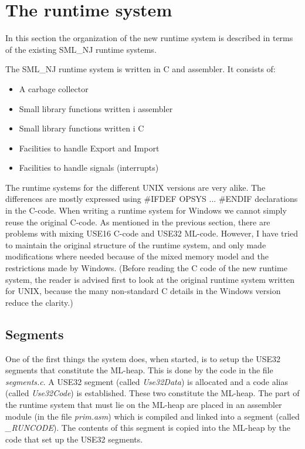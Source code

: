 \section{The runtime system} \label{sec:runtime}

In this section the organization of the new runtime system is
described in terms of the existing SML\_NJ runtime systems.

The SML\_NJ runtime system is written in C and assembler. It consists of:
\begin{itemize}
\item A carbage collector
\item Small library functions written i assembler
\item Small library functions written i C
\item Facilities to handle Export and Import
\item Facilities to handle signals (interrupts)
\end{itemize}

The runtime systems for the different UNIX versions are very alike.
The differences are mostly expressed using \#IFDEF OPSYS ...
\#ENDIF declarations in the C-code. When writing a runtime system for
Windows we cannot simply reuse the original C-code. As mentioned in
the previous section, there are problems with mixing USE16 C-code and
USE32 ML-code. However, I have tried to maintain the original
structure of the runtime system, and only made modifications where
needed because of the mixed memory model and the restrictions made by
Windows. (Before reading the C code of the new runtime system, the
reader is advised first to look at the original runtime system written
for UNIX, because the many non-standard C details in the Windows
version reduce the clarity.)

\subsection{Segments} \label{sec:segments}

One of the first things the system does, when started, is to setup the
USE32 segments that constitute the ML-heap. This is done by the code
in the file {\em segments.c\/}. A USE32 segment (called {\em
Use32Data\/}) is allocated and a code alias (called {\em Use32Code\/})
is established.  These two constitute the ML-heap. The part of the
runtime system that must lie on the ML-heap are placed in an assembler
module (in the file {\em prim.asm}) which is compiled and linked into
a segment (called {\em \_RUNCODE\/}). The contents of this segment is
copied into the ML-heap by the code that set up the USE32 segments.

